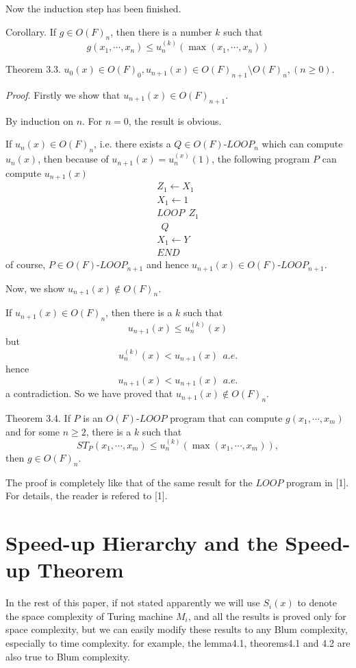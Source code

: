 Now the induction step has been finished.

Corollary. If $g\in O(F)_n$, then there is a number $k$ such that 
$$g(x_1,\cdots,x_n)\le u^{(k)}_n(\max(x_1,\cdots,x_n))$$

Theorem 3.3. $u_0(x)\in O(F)_0, u_{n+1}(x)\in O(F)_{n+1}\setminus O(F)_n, (n\ge 0).$

{\it Proof}. Firstly we show that $u_{n+1}(x)\in O(F)_{n+1}$.

By induction on $n$. For $n=0$, the result is obvious.

If $u_n(x)\in O(F)_n$, i.e. there exists a $Q\in O(F)$-$LOOP_n$
which can compute $u_n(x)$, then because of 
$u_{n+1}(x)=u^{(x)}_n(1)$, the following program $P$ can compute 
$u_{n+1}(x)$
$$\begin{array}{l}  
Z_1\longleftarrow X_1\\
X_1\longleftarrow 1\\
LOOP\ \ Z_1\\
\ \ Q\\
X_1\longleftarrow Y\\
END\end{array}$$
of course, $P\in O(F)$-$LOOP_{n+1}$ and hence
$u_{n+1}(x)\in O(F)$-$LOOP_{n+1}$.

Now, we show $u_{n+1}(x)\notin O(F)_n$. 

If $u_{n+1}(x)\in O(F)_n$, then there is a $k$ such that
$$u_{n+1}(x)\le u^{(k)}_n(x)$$
but
$$u^{(k)}_n(x)<u_{n+1}(x)\ \ a.e.$$
hence
$$u_{n+1}(x)<u_{n+1}(x)\ \ a.e.$$
a contradiction. So we have proved that $u_{n+1}(x)\notin 
O(F)_n$.

Theorem 3.4. If $P$ is an $O(F)$-$LOOP$ program that can compute
$g(x_1,\cdots,x_m)$ and for some $n\ge 2$, there is a $k$ such 
that
$$ST_P(x_1,\cdots,x_m)\le u^{(k)}_n(\max(x_1,\cdots,x_m)),$$
then $g\in O(F)_n$.

The proof is completely like that of the same result for the
$LOOP$ program in [1]. For details, the reader is refered to [1].

\section{Speed-up Hierarchy and the Speed-up Theorem}

In the rest of this paper, if not stated apparently we will use
$S_i(x)$ to denote the space complexity of Turing machine $M_i$,
and all the results is proved only for space complexity, but we
can easily modify these results to any Blum complexity, especially
to time complexity. for example, the lemma4.1, theorems4.1 and 4.2
are also true to Blum complexity.
 
